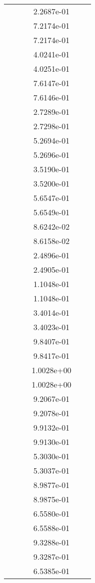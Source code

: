 \begin{xltabular}{\textwidth}{r|rS[table-format=1.3e+2]S[table-format=1.4e+2]S[table-format=1.4e+2]S[table-format=-1.5]}
&  &  & 2.2687e-01 & & \\
&  &  & 7.2174e-01 & & \\
&  &  & 7.2174e-01 & & \\
&  &  & 4.0241e-01 & & \\
&  &  & 4.0251e-01 & & \\
&  &  & 7.6147e-01 & & \\
&  &  & 7.6146e-01 & & \\
&  &  & 2.7289e-01 & & \\
&  &  & 2.7298e-01 & & \\
&  &  & 5.2694e-01 & & \\
&  &  & 5.2696e-01 & & \\
&  &  & 3.5190e-01 & & \\
&  &  & 3.5200e-01 & & \\
&  &  & 5.6547e-01 & & \\
&  &  & 5.6549e-01 & & \\
&  &  & 8.6242e-02 & & \\
&  &  & 8.6158e-02 & & \\
&  &  & 2.4896e-01 & & \\
&  &  & 2.4905e-01 & & \\
&  &  & 1.1048e-01 & & \\
&  &  & 1.1048e-01 & & \\
&  &  & 3.4014e-01 & & \\
&  &  & 3.4023e-01 & & \\
&  &  & 9.8407e-01 & & \\
&  &  & 9.8417e-01 & & \\
&  &  & 1.0028e+00 & & \\
&  &  & 1.0028e+00 & & \\
&  &  & 9.2067e-01 & & \\
&  &  & 9.2078e-01 & & \\
&  &  & 9.9132e-01 & & \\
&  &  & 9.9130e-01 & & \\
&  &  & 5.3030e-01 & & \\
&  &  & 5.3037e-01 & & \\
&  &  & 8.9877e-01 & & \\
&  &  & 8.9875e-01 & & \\
&  &  & 6.5580e-01 & & \\
&  &  & 6.5588e-01 & & \\
&  &  & 9.3288e-01 & & \\
&  &  & 9.3287e-01 & & \\
&  &  & 6.5385e-01 & & \\

\end{xltabular}
